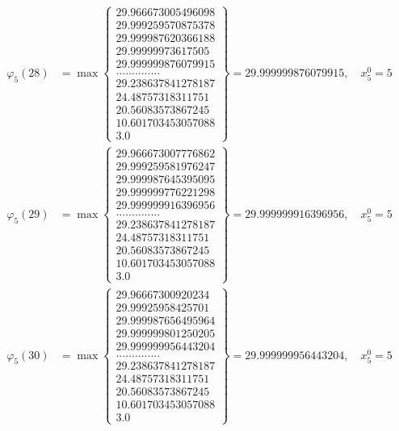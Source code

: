 \documentclass{article}
\begin{document}
\begin{align*}
  
  
  
\varphi_{5}(28) &= \max \left\{ \begin{array}{c}
29.966673005496098 \\
 29.999259570875378 \\
 29.999987620366188 \\
 29.99999973617505 \\
 29.999999876079915 \\
 .............. \\
 29.238637841278187 \\
 24.48757318311751 \\
 20.56083573867245 \\
 10.601703453057088 \\
 3.0
\end{array} \right\} = 29.999999876079915, \quad x_{5}^0 = 5\\
  
  
  
  
\varphi_{5}(29) &= \max \left\{ \begin{array}{c}
29.966673007776862 \\
 29.999259581976247 \\
 29.999987645395095 \\
 29.999999776221298 \\
 29.999999916396956 \\
 .............. \\
 29.238637841278187 \\
 24.48757318311751 \\
 20.56083573867245 \\
 10.601703453057088 \\
 3.0
\end{array} \right\} = 29.999999916396956, \quad x_{5}^0 = 5\\
  
  
  
  
\varphi_{5}(30) &= \max \left\{ \begin{array}{c}
29.96667300920234 \\
 29.99925958425701 \\
 29.999987656495964 \\
 29.999999801250205 \\
 29.999999956443204 \\
 .............. \\
 29.238637841278187 \\
 24.48757318311751 \\
 20.56083573867245 \\
 10.601703453057088 \\
 3.0
\end{array} \right\} = 29.999999956443204, \quad x_{5}^0 = 5\\
  

\end{align*}
\end{document}
